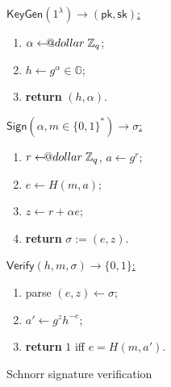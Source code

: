 \documentclass{template}
\makeatletter
\newcommand\leftarrowS{\leftarrow\joinrel\smalldollar}
\newcommand{\smalldollar}{\mathrel{\mathpalette\small@dollar\relax}}
\newcommand{\small@dollar}[2]{%
  \vcenter{\hbox{%
    $#1\textnormal{\fontsize{0.7\dimexpr\f@size pt}{0}\selectfont\$}$%
  }}%
}
\makeatother
\begin{document}
\begin{figure}[ht]
\centering
\footnotesize 

\begin{minipage}[t]{0.32\linewidth}
    \begin{mdframed}[linecolor=black, linewidth=1.0pt,
                     skipabove=5pt, skipbelow=5pt,
                     innerleftmargin=5pt, innerrightmargin=5pt]
        \centering
        \colorbox{purple!10}{\underline{$\mathsf{KeyGen}(1^{\lambda}) \to (\mathsf{pk},\mathsf{sk})$:}}
        \begin{enumerate}
            \item $\alpha \leftarrowS \mathbb{Z}_q$;
            \item $h \leftarrow g^{\alpha} \in \mathbb{G}$;
            \item \textbf{return} $(h, \alpha)$.
        \end{enumerate}
    \end{mdframed}
    \caption{Schnorr keypair generation}
    \label{fig:schnorr-keygen}
\end{minipage}
\hfill
\begin{minipage}[t]{0.32\linewidth}
    \begin{mdframed}[linecolor=black, linewidth=1.0pt,
                     skipabove=5pt, skipbelow=5pt,
                     innerleftmargin=5pt, innerrightmargin=5pt]
        \centering
        \colorbox{green!10}{\underline{$\mathsf{Sign}(\alpha, m \in \{0,1\}^*) \to \sigma$:}}
        \begin{enumerate}
            \item $r \leftarrowS \mathbb{Z}_q$, $a \gets g^r$;
            \item $e \gets H(m, a)$;
            \item $z \gets r + \alpha e$;
            \item \textbf{return} $\sigma := (e, z)$.
        \end{enumerate}
    \end{mdframed}
    \caption{Schnorr signing} 
    \label{fig:schnorr-sign}
\end{minipage}
\hfill
\begin{minipage}[t]{0.32\linewidth}
    \begin{mdframed}[linecolor=black, linewidth=1.0pt,
                     skipabove=5pt, skipbelow=5pt,
                     innerleftmargin=5pt, innerrightmargin=5pt]
        \centering
        \colorbox{green!10}{\underline{$\mathsf{Verify}(h, m, \sigma) \to \{0,1\}$:}}
        \begin{enumerate}
            \item parse $(e, z) \gets \sigma$;
            \item $a' \gets g^{z}h^{-e}$;
            \item \textbf{return} $1$ iff $e = H(m,a')$.
        \end{enumerate}
    \end{mdframed}
    \caption{Schnorr signature verification}
    \label{fig:schnorr-verify}
\end{minipage}
\end{figure}
\end{document}
